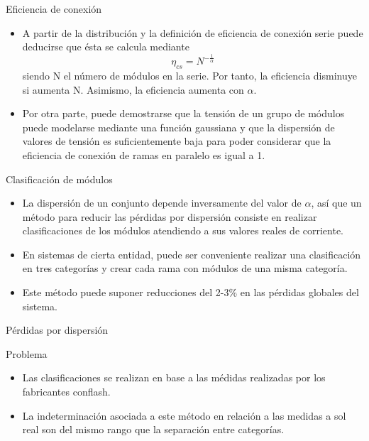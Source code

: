 \documentclass[xcolor={usenames,svgnames,dvipsnames}]{beamer}
\begin{document}
\begin{frame}[label={sec:org2b5b8d6}]{Eficiencia de conexión}
\begin{itemize}
\item A partir de la distribución y la definición de eficiencia de conexión serie puede deducirse que ésta se calcula mediante $$\eta_{cs}=N^{-\frac{1}{\alpha}}$$ siendo N el número de módulos en la serie. Por tanto, \alert{la eficiencia disminuye si aumenta N}. Asimismo, la eficiencia aumenta con \(\alpha\).

\item Por otra parte, puede demostrarse que la \alert{tensión de un grupo de módulos} puede modelarse mediante una función \alert{gaussiana} y que \alert{la dispersión de valores de tensión es suficientemente baja para poder  considerar que la eficiencia de conexión de ramas en paralelo es igual a 1.}
\end{itemize}
\end{frame}

\begin{frame}[label={sec:orgcf2ea58}]{Clasificación de módulos}
\begin{itemize}
\item La dispersión de un conjunto depende inversamente del valor de
\(\alpha\), así que un \alert{método para reducir las pérdidas por
dispersión} consiste en \alert{realizar clasificaciones} de los módulos
atendiendo a sus valores reales de corriente.

\item En sistemas de cierta entidad, puede ser conveniente realizar una
clasificación en tres categorías y crear cada rama con módulos de una
misma categoría.

\item Este método puede suponer reducciones del 2-3\% en las pérdidas
globales del sistema.
\end{itemize}
\end{frame}

\begin{frame}[label={sec:org9cb0b2c}]{Pérdidas por dispersión}
\begin{block}{Problema}
\begin{itemize}
\item Las clasificaciones se realizan en base a las médidas realizadas por
los fabricantes con\guillemotleft{}flash\guillemotright{}.

\item \alert{La indeterminación asociada a este método en relación a las medidas
a sol real son del mismo rango que la separación entre categorías.}
\end{itemize}
\end{block}
\end{frame}
\end{document}
